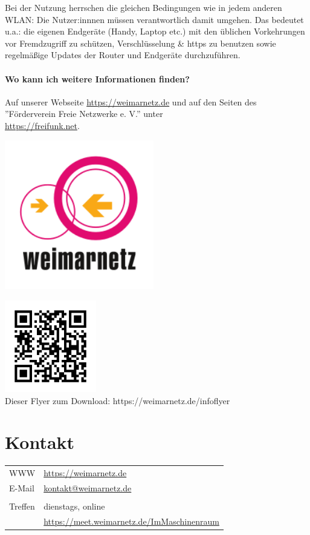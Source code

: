 \documentclass[10pt,a4paper,notumble]{leaflet}
\begin{document}
Bei der Nutzung herrschen die gleichen Bedingungen wie in jedem anderen WLAN: Die Nutzer:innnen müssen verantwortlich damit umgehen. Das bedeutet u.a.: die eigenen Endgeräte (Handy, Laptop etc.) mit den üblichen Vorkehrungen vor Fremdzugriff zu schützen, Verschlüsselung \& https zu benutzen sowie regelmäßige Updates der Router und Endgeräte durchzuführen.

\paragraph{Wo kann ich weitere Informationen finden?}
Auf unserer Webseite \href{https://weimarnetz.de}{https://weimarnetz.de} und auf den Seiten des ''Förderverein Freie Netzwerke e. V.'' unter \\\href{https://freifunk.net}{https://freifunk.net}.

\newpage
\begin{center}
\includegraphics[width=65mm]{weimarnetz_logo.png}
\end{center}
\vspace{3em}
\begin{center}
\includegraphics[width=40mm]{qr.png}\\
\footnotesize Dieser Flyer zum Download: https://weimarnetz.de/infoflyer
\end{center}
\vfill
\section{Kontakt}
\begin{tabular}{ll}
WWW & \href{https://weimarnetz.de}{https://weimarnetz.de}\\
E-Mail & \href{mailto:kontakt@weimarnetz.de}{kontakt@weimarnetz.de}\\
        \\
Treffen & dienstags, online\\
	& \href{https://meet.weimarnetz.de/ImMaschinenraum}{\small https://meet.weimarnetz.de/ImMaschinenraum}
\end{tabular}
\end{document}
